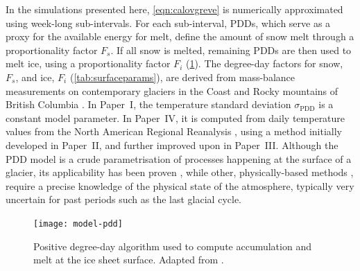 \documentclass{article}
\newcommand{\sPDD}[0]{\sigma_{\mathrm{PDD}}}
\newcommand{\CCLI}[0]{Paper~I}      %
\newcommand{\PSDV}[0]{Paper~II}     %
\newcommand{\PSDP}[0]{Paper~III}    %
\newcommand{\CCYC}[0]{Paper~IV}     %
\begin{document}
In the simulations presented here, \cref{eqn:calovgreve} is numerically
approximated using week-long sub-intervals. For each sub-interval, PDDs, which
serve as a proxy for the available energy for melt, define the amount of snow
melt through a proportionality factor $F_s$. If all snow is melted, remaining
PDDs are then used to melt ice, using a proportionality factor $F_i$
(\cref{fig:model-pdd}). The degree-day factors for snow, $F_s$, and ice, $F_i$
(\cref{tab:surfaceparams}),
are derived from mass-balance measurements on contemporary glaciers in the
Coast and Rocky mountains of British Columbia \citep{Shea.etal.2009}. In
{\CCLI}, the temperature standard deviation $\sPDD$ is a constant model
parameter. In {\CCYC}, it is computed from daily temperature values from the
North American Regional Reanalysis \citep[NARR,][]{Mesinger.etal.2006}, using
a method initially developed in {\PSDV}, and further improved upon in {\PSDP}.
Although the PDD model is a crude parametrisation of processes happening at the
surface of a glacier, its applicability has been proven \citep{Hock.2003},
while other, physically-based methods \citep[e.g.][]{Hock.2005}, require a
precise knowledge of the physical state of the atmosphere, typically very
uncertain for past periods such as the last glacial cycle.

\begin{figure}
  \centering
  \texttt{[image: model-pdd]}
  \caption{Positive degree-day algorithm used to compute accumulation and melt
           at the ice sheet surface. Adapted from \citet{PISM-authors.2014}.}
  \label{fig:model-pdd}
\end{figure}
\end{document}
